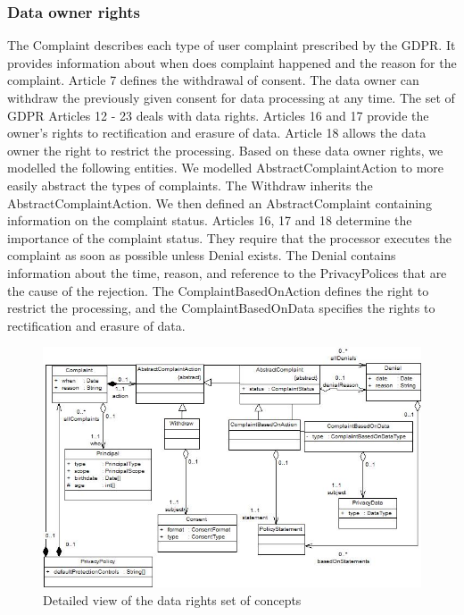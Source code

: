 \documentclass[11pt,english]{article}
\begin{document}
\subsubsection{Data owner rights}
The Complaint describes each type of user complaint prescribed by the GDPR. It provides information about when does complaint happened and the reason for the complaint. Article 7 defines the withdrawal of consent. The data owner can withdraw the previously given consent for data processing at any time. The set of GDPR Articles 12 - 23 deals with data rights. Articles 16 and 17 provide the owner's rights to rectification and erasure of data. Article 18 allows the data owner the right to restrict the processing. Based on these data owner rights, we modelled the following entities. \newline We modelled AbstractComplaintAction to more easily abstract the types of complaints. The Withdraw inherits the AbstractComplaintAction. We then defined an AbstractComplaint containing information on the complaint status. Articles 16, 17 and 18 determine the importance of the complaint status. They require that the processor executes the complaint as soon as possible unless Denial exists. The Denial contains information about the time, reason, and reference to the PrivacyPolices that are the cause of the rejection. The ComplaintBasedOnAction defines the right to restrict the processing, and the ComplaintBasedOnData specifies the rights to rectification and erasure of data.
\begin{figure}[H]
    \centering
    \includegraphics[width=12.5cm]{images/dataRights.jpg}
    \caption{Detailed view of the data rights set of concepts}
    \label{fig:DataRights}
\end{figure}
\end{document}
